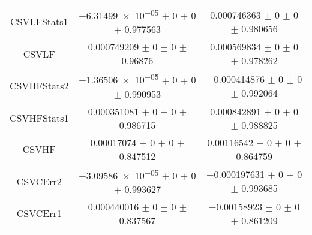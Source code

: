 \begin{table}
\begin{tabular}{ccc}
CSVLFStats1 	& \num{-6.31499e-05} $\pm$ \num{0} $\pm$ \num{0} $\pm$ \num{0.977563} 	& \num{0.000746363} $\pm$ \num{0} $\pm$ \num{0} $\pm$ \num{0.980656}\\
CSVLF 	& \num{0.000749209} $\pm$ \num{0} $\pm$ \num{0} $\pm$ \num{0.96876} 	& \num{0.000569834} $\pm$ \num{0} $\pm$ \num{0} $\pm$ \num{0.978262}\\
CSVHFStats2 	& \num{-1.36506e-05} $\pm$ \num{0} $\pm$ \num{0} $\pm$ \num{0.990953} 	& \num{-0.000414876} $\pm$ \num{0} $\pm$ \num{0} $\pm$ \num{0.992064}\\
CSVHFStats1 	& \num{0.000351081} $\pm$ \num{0} $\pm$ \num{0} $\pm$ \num{0.986715} 	& \num{0.000842891} $\pm$ \num{0} $\pm$ \num{0} $\pm$ \num{0.988825}\\
CSVHF 	& \num{0.00017074} $\pm$ \num{0} $\pm$ \num{0} $\pm$ \num{0.847512} 	& \num{0.00116542} $\pm$ \num{0} $\pm$ \num{0} $\pm$ \num{0.864759}\\
CSVCErr2 	& \num{-3.09586e-05} $\pm$ \num{0} $\pm$ \num{0} $\pm$ \num{0.993627} 	& \num{-0.000197631} $\pm$ \num{0} $\pm$ \num{0} $\pm$ \num{0.993685}\\
CSVCErr1 	& \num{0.000440016} $\pm$ \num{0} $\pm$ \num{0} $\pm$ \num{0.837567} 	& \num{-0.00158923} $\pm$ \num{0} $\pm$ \num{0} $\pm$ \num{0.861209}\\
\bottomrule
\end{tabular}
\end{table}